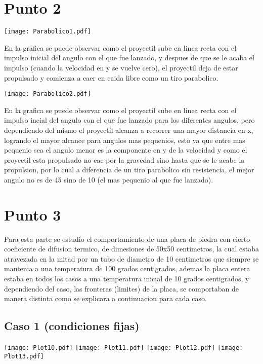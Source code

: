 \documentclass[a4paper,11pt]{article}
\begin{document}
\section{Punto 2}

\texttt{[image: Parabolico1.pdf]}

En la grafica se puede observar como el proyectil sube en linea recta con el impulso inicial del angulo con el que fue lanzado, y despues de que se le acaba el impulso (cuando la velocidad en y se vuelve cero), el proyectil deja de estar propulsado y comienza a caer en caida libre como un tiro parabolico.

\texttt{[image: Parabolico2.pdf]}

En la grafica se puede observar como el proyectil sube en linea recta con el impulso incial del angulo con el que fue lanzado para los diferentes angulos, pero dependiendo del mismo el proyectil alcanza a recorrer una mayor distancia en x, logrando el mayor alcance para angulos mas pequenios, esto ya que entre mas pequenio sea el angulo menor es la componente en y de la velocidad y como el proyectil esta propulsado no cae por la gravedad sino hasta que se le acabe la propulsion, por lo cual a diferencia de un tiro parabolico sin resistencia, el mejor angulo no es de 45 sino de 10 (el mas pequenio al que fue lanzado).

\section{Punto 3}

Para esta parte se estudio el comportamiento de una placa de piedra con cierto coeficiente de difusion termico, de dimesiones de 50x50 centimetros, la cual estaba atravezada en la mitad por un tubo de diametro de 10 centimetros que siempre se mantenia a una temperatura de 100 grados centigrados, ademas la placa entera estaba en todos los casos a una temperatura inicial de 10 grados centigrados, y dependiendo del caso, las fronteras (limites) de la placa, se comportaban de manera distinta como se explicara a continuacion para cada caso.

\subsection{Caso 1 (condiciones fijas)}

\texttt{[image: Plot10.pdf]}
\texttt{[image: Plot11.pdf]}
\texttt{[image: Plot12.pdf]}
\texttt{[image: Plot13.pdf]}
\end{document}
